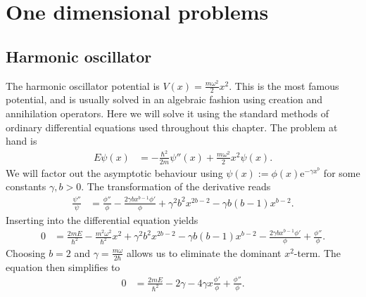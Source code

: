 \documentclass[english, parskip=full]{scrartcl}
\title{\titel}
\date{\today}
\newcommand{\e}{\text{e}}
\begin{document}
\maketitle  %

\section{One dimensional problems}
\subsection{Harmonic oscillator}
The harmonic oscillator potential is $V(x) = \frac{m\omega^2}{2}x^2$.
This is the most famous potential, and is usually solved in an algebraic fashion using creation and annihilation operators.
Here we will solve it using the standard methods of ordinary differential equations used throughout this chapter.
The problem at hand is
\begin{align}
E\psi(x) &= -\frac{\hbar^2}{2m}\psi''(x) + \frac{m\omega^2}{2}x^2\psi(x).
\end{align}
We will factor out the asymptotic behaviour using $\psi(x) := \phi(x) \e^{-\gamma x^b}$ for some constants $\gamma,b>0$.
The transformation of the derivative reads
\begin{align}
\frac{\psi''}{\psi} &= \frac{\phi''}{\phi} - \frac{2\gamma bx^{b-1}\phi'}{\phi} + \gamma^2b^2x^{2b-2} - \gamma b(b-1)x^{b-2}.
\end{align}
Inserting into the differential equation yields
\begin{align}
0 &= \frac{2mE}{\hbar^2} - \frac{m^2\omega^2}{\hbar^2}x^2 +  \gamma^2b^2x^{2b-2} - \gamma b(b-1)x^{b-2} - \frac{2\gamma bx^{b-1}\phi'}{\phi} + \frac{\phi''}{\phi}.
\end{align}
Choosing $b=2$ and $\gamma = \frac{m\omega}{2\hbar}$ allows us to eliminate the dominant $x^2$-term.
The equation then simplifies to
\begin{align}
0 &= \frac{2mE}{\hbar^2} - 2\gamma - 4\gamma x\frac{\phi'}{\phi} + \frac{\phi''}{\phi}.
\end{align}
\end{document}
